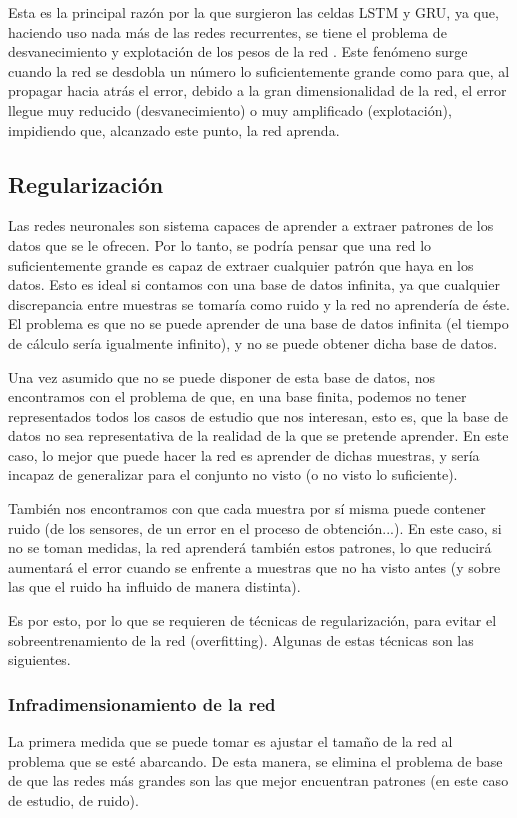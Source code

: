 Esta es la principal razón por la que surgieron las celdas LSTM y GRU, ya que, haciendo uso nada más de las redes recurrentes, se tiene el problema de desvanecimiento y explotación de los pesos de la red \cite{bengio1994learning}. Este fenómeno surge cuando la red se desdobla un número lo suficientemente grande como para que, al propagar hacia atrás el error, debido a la gran dimensionalidad de la red, el error llegue muy reducido (desvanecimiento) o muy amplificado (explotación), impidiendo que, alcanzado este punto, la red aprenda.

\subsection{Regularización}
Las redes neuronales son sistema capaces de aprender a extraer patrones de los datos que se le ofrecen. Por lo tanto, se podría pensar que una red lo suficientemente grande es capaz de extraer cualquier patrón que haya en los datos. Esto es ideal si contamos con una base de datos infinita, ya que cualquier discrepancia entre muestras se tomaría como ruido y la red no aprendería de éste. El problema es que no se puede aprender de una base de datos infinita (el tiempo de cálculo sería igualmente infinito), y no se puede obtener dicha base de datos.

Una vez asumido que no se puede disponer de esta base de datos, nos encontramos con el problema de que, en una base finita, podemos no tener representados todos los casos de estudio que nos interesan, esto es, que la base de datos no sea representativa de la realidad de la que se pretende aprender. En este caso, lo mejor que puede hacer la red es aprender de dichas muestras, y sería incapaz de generalizar para el conjunto no visto (o no visto lo suficiente).

También nos encontramos con que cada muestra por sí misma puede contener ruido (de los sensores, de un error en el proceso de obtención...). En este caso, si no se toman medidas, la red aprenderá también estos patrones, lo que reducirá aumentará el error cuando se enfrente a muestras que no ha visto antes (y sobre las que el ruido ha influido de manera distinta).

Es por esto, por lo que se requieren de técnicas de regularización, para evitar el sobreentrenamiento de la red (overfitting). Algunas de estas técnicas son las siguientes.

\subsubsection{Infradimensionamiento de la red}
La primera medida que se puede tomar es ajustar el tamaño de la red al problema que se esté abarcando. De esta manera, se elimina el problema de base de que las redes más grandes son las que mejor encuentran patrones (en este caso de estudio, de ruido).
